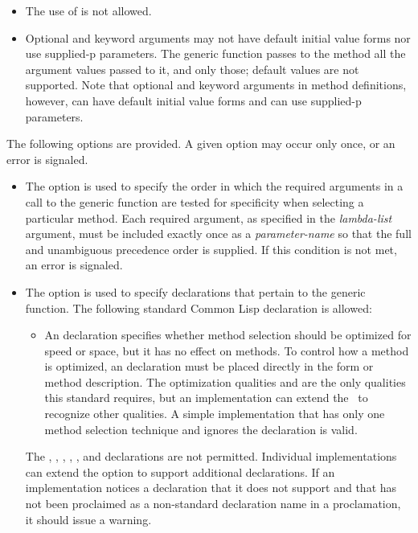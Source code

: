 \begin{defmac}
\begin{itemize}
\item 
The use of  is not allowed. 

\item 
Optional and keyword arguments may not have default initial value forms
nor use supplied-p parameters.
The generic function passes to the method all the argument values passed to
it, and only those; default values are not supported.
Note that optional and keyword arguments in method definitions, however,
can have default initial value forms and can use supplied-p parameters. 
\end{itemize}

The following options are provided.  A given option may occur only once,
or an error is signaled.

\begin{itemize}
 
\item  
The  option is used to specify the
order in which the required arguments in a call to the generic
function are tested for specificity when selecting a particular
method.  Each required argument, as specified in the \emph{lambda-list\/}
argument, must be included exactly once as a {\it
parameter-name} so that the full and unambiguous precedence order is
supplied.  If this condition is not met, an error is signaled.

\item 
The  option is used to specify declarations that pertain
to the generic function.  The following standard Common Lisp
declaration is allowed:

\begin{itemize}
\item
An  declaration specifies whether method selection
should be optimized for speed or space, but it has no effect on
methods.  To control how a method is optimized, an 
declaration must be placed directly in the  form or
method description.  The optimization qualities  and 
 are the only qualities this standard requires, but an
implementation can extend the \CLOS\ to recognize other qualities.  A
simple implementation that has only one method selection technique and
ignores the  declaration is valid.
\end{itemize}

The , , , , 
, and  declarations are not permitted.
Individual implementations can extend the  option to
support additional declarations.  If an implementation notices a
declaration that it does not support and that has not been proclaimed
as a non-standard declaration name in a  proclamation, it
should issue a warning.


\end{itemize}
\end{defmac}
